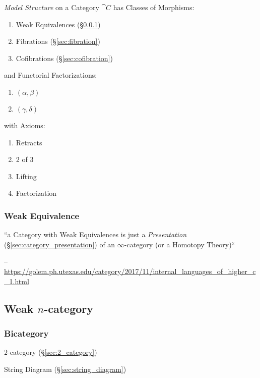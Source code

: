 \emph{Model Structure} on a Category $\cat{C}$ has Classes of
Morphisms:
\begin{enumerate}
  \item Weak Equivalences (\S\ref{sec:weak_equivalence})
  \item Fibrations (\S\ref{sec:fibration})
  \item Cofibrations (\S\ref{sec:cofibration})
\end{enumerate}
and Functorial Factorizations:
\begin{enumerate}
  \item $(\alpha,\beta)$
  \item $(\gamma,\delta)$
\end{enumerate}
with Axioms:
\begin{enumerate}
  \item Retracts
  \item 2 of 3
  \item Lifting
  \item Factorization
\end{enumerate} %




\subsubsection{Weak Equivalence}\label{sec:weak_equivalence}

``a Category with Weak Equivalences is just a \emph{Presentation}
(\S\ref{sec:category_presentation}) of an $\infty$-category (or a Homotopy
Theory)``

--\url{https://golem.ph.utexas.edu/category/2017/11/internal_languages_of_higher_c_1.html}



\subsection{Weak $n$-category}\label{sec:weak_ncategory}

\subsubsection{Bicategory}\label{sec:bicategory}

$2$-category (\S\ref{sec:2_category})

String Diagram (\S\ref{sec:string_diagram})

